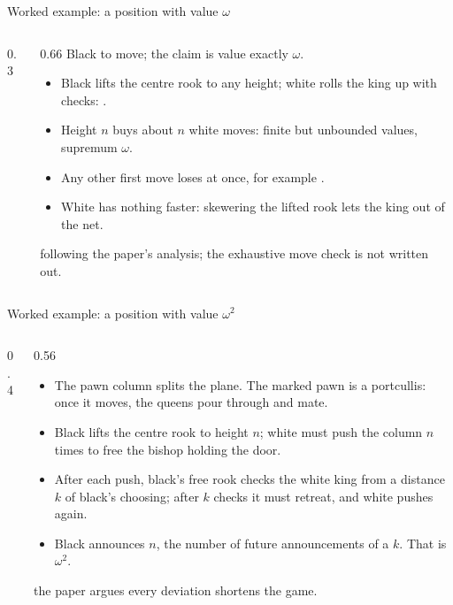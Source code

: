 \documentclass[aspectratio=169,10pt]{beamer}
\newcommand{\EH}{[EH14]}
\begin{document}
\begin{frame}{Worked example: a position with value $\omega$}
  \begin{columns}[T]
    \begin{column}{0.3\textwidth}
      \credit{Figure 3 of \EH.}
    \end{column}
    \begin{column}{0.66\textwidth}
      Black to move; the claim is value exactly $\omega$.
      \begin{itemize}
        \item Black lifts the centre rook to any height; white rolls the king up with checks:
          .
        \item Height $n$ buys about $n$ white moves: finite but unbounded values, supremum $\omega$.
        \item Any other first move loses at once, for example .
        \item White has nothing faster: skewering the lifted rook lets the king out of the net.
      \end{itemize}
       following the paper's analysis; the exhaustive move check is not written out.
    \end{column}
  \end{columns}
\end{frame}

\begin{frame}{Worked example: a position with value $\omega^2$}
  \begin{columns}[T]
    \begin{column}{0.4\textwidth}
      \credit{Figure 7 of \EH.}
    \end{column}
    \begin{column}{0.56\textwidth}
      \begin{itemize}
        \item The pawn column splits the plane. The marked pawn is a portcullis: once it moves, the
          queens pour through and mate.
        \item Black lifts the centre rook to height $n$; white must push the column $n$ times to free the
          bishop holding the door.
        \item After each push, black's free rook checks the white king from a distance $k$ of black's
          choosing; after $k$ checks it must retreat, and white pushes again.
        \item Black announces $n$, the number of future announcements of a $k$. That is $\omega^2$.
      \end{itemize}
       the paper argues every deviation shortens the game.
    \end{column}
  \end{columns}
\end{frame}
\end{document}

